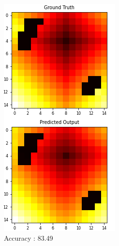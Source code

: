 \begin{figure}[!htb]
   \begin{minipage}{0.5\textwidth}
     \centering
     \includegraphics[width=.7\linewidth]{../openreview/images/media_images_test_samples_2838_0(1)(1)(1).png}
    \caption{Accuracy : 83.49}
   \end{minipage}\hfill
   \begin{minipage}{0.5\textwidth}
     \centering

\end{minipage}
\end{figure}
